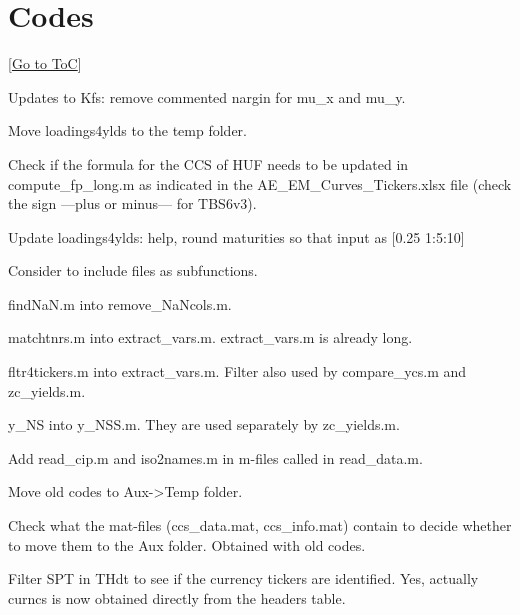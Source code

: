 \documentclass[12pt]{article}
\newcommand{\gototoc}{\vspace{-1.8cm} \null\hfill [\hyperlink{toc}{Go to ToC}] \newline}
\newcommand{\cmark}{\ding{51}}
\newcommand{\xmark}{\ding{55}}
\newcommand{\done}{\rlap{$\square$}{\raisebox{2pt}{\large\hspace{1pt}\cmark}}%
	\hspace{-2.5pt}}
\newcommand{\wontdo}{\rlap{$\square$}{\large\hspace{1pt}\xmark}}
\begin{document}
\section{Codes}
\gototoc
\begin{todolist}
	\item Updates to Kfs: remove commented nargin for mu_x and mu_y.
	\item Move loadings4ylds to the temp folder.
	\item Check if the formula for the CCS of HUF needs to be updated in compute_fp_long.m as indicated in the AE_EM_Curves_Tickers.xlsx file (check the sign ---plus or minus--- for TBS6v3).
	\item[\done] Update loadings4ylds: help, round maturities so that input as [0.25 1:5:10]
	\item[\done] Consider to include files as subfunctions.
	\begin{todolist}
		\item[\done] findNaN.m into remove_NaNcols.m.
		\item[\wontdo] matchtnrs.m into extract_vars.m. extract_vars.m is already long.
		\item[\wontdo] fltr4tickers.m into extract_vars.m. Filter also used by compare_ycs.m and zc_yields.m.
		\item[\wontdo] y_NS into y_NSS.m. They are used separately by zc_yields.m.
	\end{todolist}
	\item[\done] Add read_cip.m and iso2names.m in m-files called in read_data.m.
	\item[\done] Move old codes to Aux->Temp folder.
	\item[\wontdo] Check what the mat-files (ccs_data.mat, ccs_info.mat) contain to decide whether to move them to the Aux folder. Obtained with old codes.
	\item[\done] Filter SPT in THdt to see if the currency tickers are identified. Yes, actually curncs is now obtained directly from the headers table.
\end{todolist}
\end{document}
